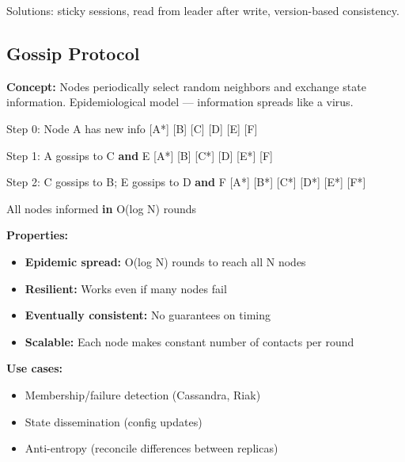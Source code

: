 \documentclass[11pt]{article}
\providecommand{\tightlist}{\setlength{\itemsep}{1pt}\setlength{\parskip}{0pt}}
\newenvironment{Shaded}{\begin{snugshade}}{\end{snugshade}}
\newcommand{\DecValTok}[1]{\textcolor[rgb]{0.96,0.45,0.00}{#1}}
\newcommand{\KeywordTok}[1]{\textcolor[rgb]{0.81,0.81,0.76}{\textbf{#1}}}
\newcommand{\NormalTok}[1]{\textcolor[rgb]{0.81,0.81,0.76}{#1}}
\newcommand{\OperatorTok}[1]{\textcolor[rgb]{0.81,0.81,0.76}{#1}}
\begin{document}
Solutions: sticky sessions, read from leader after write, version-based consistency.

\subsection{Gossip Protocol}\label{gossip-protocol}

\textbf{Concept:} Nodes periodically select random neighbors and exchange state information. Epidemiological model --- information spreads like a virus.


\begin{Shaded}
\begin{Highlighting}[]
\NormalTok{Step }\DecValTok{0}\NormalTok{: Node A has new info}
\NormalTok{        [A}\OperatorTok{*}\NormalTok{] [B] [C] [D] [E] [F]}

\NormalTok{Step }\DecValTok{1}\NormalTok{: A gossips to C }\KeywordTok{and}\NormalTok{ E}
\NormalTok{        [A}\OperatorTok{*}\NormalTok{] [B] [C}\OperatorTok{*}\NormalTok{] [D] [E}\OperatorTok{*}\NormalTok{] [F]}

\NormalTok{Step }\DecValTok{2}\NormalTok{: C gossips to B}\OperatorTok{;}\NormalTok{ E gossips to D }\KeywordTok{and}\NormalTok{ F}
\NormalTok{        [A}\OperatorTok{*}\NormalTok{] [B}\OperatorTok{*}\NormalTok{] [C}\OperatorTok{*}\NormalTok{] [D}\OperatorTok{*}\NormalTok{] [E}\OperatorTok{*}\NormalTok{] [F}\OperatorTok{*}\NormalTok{]}

\NormalTok{All nodes informed }\KeywordTok{in}\NormalTok{ O(log N) rounds}
\end{Highlighting}
\end{Shaded}

\textbf{Properties:}

\begin{itemize}
\tightlist
\item
  \textbf{Epidemic spread:} O(log N) rounds to reach all N nodes
\item
  \textbf{Resilient:} Works even if many nodes fail
\item
  \textbf{Eventually consistent:} No guarantees on timing
\item
  \textbf{Scalable:} Each node makes constant number of contacts per round
\end{itemize}

\textbf{Use cases:}

\begin{itemize}
\tightlist
\item
  Membership/failure detection (Cassandra, Riak)
\item
  State dissemination (config updates)
\item
  Anti-entropy (reconcile differences between replicas)
\end{itemize}
\end{document}
